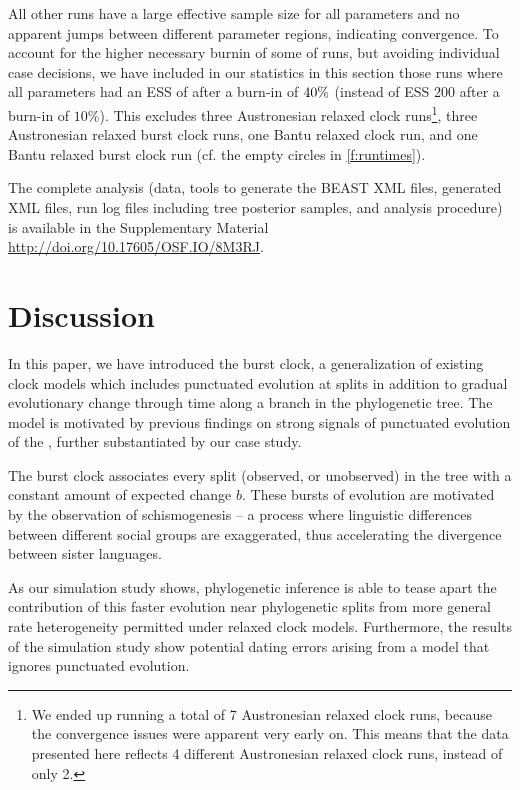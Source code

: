 \documentclass[]{rsos}%
\begin{document}
All other runs have a large effective sample size for all parameters and no
apparent jumps between different parameter regions, indicating convergence. To
account for the higher necessary burnin of some of runs, but avoiding individual
case decisions, we have included in our statistics in this section those runs
where all parameters had an ESS of \ess after a burn-in of $40\%$ (instead of
ESS 200 after a burn-in of $10\%$). This excludes three Austronesian relaxed
clock runs\footnote{We ended up running a total of 7 Austronesian relaxed clock
  runs, because the convergence issues were apparent very early on. This means
  that the data presented here reflects 4 different Austronesian relaxed clock
  runs, instead of only 2.}, three Austronesian relaxed burst clock runs, one
Bantu relaxed clock run, and one Bantu relaxed burst clock run (cf. the empty
circles in \cref{f:runtimes}).

The complete analysis (data, tools to generate the BEAST XML files, generated XML files,
run log files including tree posterior samples, and analysis procedure) is
available in the Supplementary Material \url{http://doi.org/10.17605/OSF.IO/8M3RJ}.

\section{Discussion}\label{s:discussion}

In this paper, we have introduced the burst clock, a generalization of existing clock models which includes punctuated evolution at splits in addition to gradual evolutionary change through time along a branch in the phylogenetic tree. The model is motivated by previous findings on strong signals of punctuated evolution of the \parencite{atkinson2008languages}, further substantiated by our case study. 

The burst clock associates every split (observed, or unobserved) in the tree with a constant amount of expected change $b$. These bursts of evolution are motivated by the observation of schismogenesis -- a process where linguistic differences between different social groups are exaggerated, thus accelerating the divergence between sister languages.

As our simulation study shows, phylogenetic inference is able to tease apart the
contribution of this faster evolution near phylogenetic splits from more general rate heterogeneity permitted under relaxed clock models. Furthermore, the results of the simulation study show potential dating errors arising from a model that ignores punctuated evolution.
\end{document}
